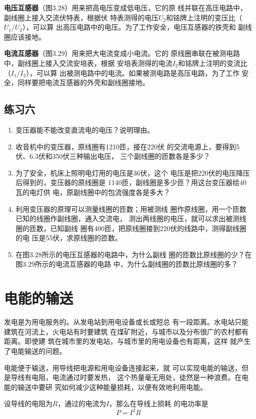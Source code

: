 \textbf{电压互感器}（图3.28）用来把高电压变成低电压，它的原
线并联在高压电路中，副线圈上接入交流伏特表，根据伏
特表测得的电压$U_2$和铭牌上注明的变压比（$U_1/U_2$），可以算
出高压电路中的电压。为了工作安全，电压互感器的铁壳和
副线圈应该接地。

\textbf{电流互感器}（图3.29）用来把大电流变成小电流。它的
原线圈串联在被测电路中，副线圈上接入交流安培表，根据
安培表测得的电流$I_2$和铭牌上注明的变流比（$I_1/I_2$），可以算
出被测电路中的电流。如果被测电路是高压电路，为了工作
安全，同样要把电流互感器的外壳和副线圈接地。

\subsection*{练习六}
\begin{enumerate}
    \item 变压器能不能改变直流电的电压？说明理由。
    \item 收音机中的变压器，原线圈有1210匝，接在220伏
的交流电源上，要得到5伏、6.3伏和350伏三种输出电压，
三个副线圈的匝数各是多少？
\item 为了安全，机床上照明电灯用的电压是36伏，这个
电压是把220伏的电压降压后得到的，变压器的原线圈是
1140匝，副线圈是多少匝？用这台变压器给40瓦的电灯供
电，原副线圈中的包流强度各是多大？
\item 利用变压器的原理可以测量线圈的匝数；用被测线
圈作原线圈，用一个匝数已知的线圈作副线圈，通入交流电，
测出两线圈的电压，就可以求出被测线圈的匝数，已知副线
圈有400匝，把原线圈接到220伏的线路中，测得副线圈的电
压是55伏，求原线圈的匝数。
\item 在图3.28所示的电压互感器的电路中，为什么副线
圈的匝数比原线圈的少？在图3.29所示的电流互感器的电路
中，为什么副线圈的匝数比原线圈的多？
\end{enumerate}

\section{电能的输送}
发电是为用电服务的。从发电站到用电设备或长或短总
有一段距离。水电站只能建筑在河流上，火电站有时要建筑
在煤矿附近，与城市以及分布很广的农村都有距离。即使建
筑在城市里的发电站，与城市里的用电设备也有距离，这样
就产生了电能输送的问题。

电能便于输送，用导线把电源和用电设备连接起来，就
可以实现电能的输送，但是导线有电阻，电流通过时要发热，
这个热量毫无用处，徒然是一种浪费。在电能的输送中要研
究如何减少这种能量损耗，以便有效地利用电能。

设导线的电阻为$R$，通过的电流为$I$，那么在导线上损耗
的电功率是
\[P=I^2R \]

